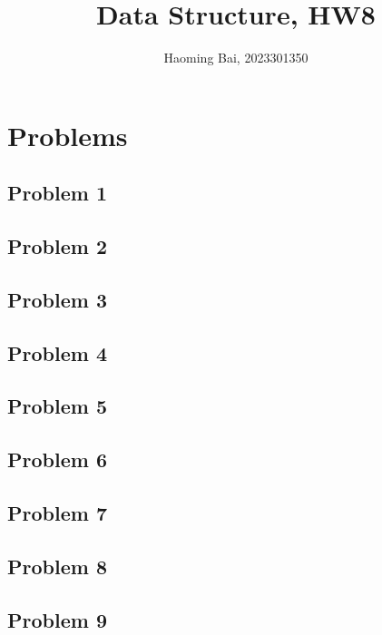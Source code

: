 \documentclass{ctexart}
\title{Data Structure, HW8}
\author{Haoming Bai, 2023301350}
\begin{document}
	\maketitle
  \tableofcontents
  \section{Problems}
  \subsection{Problem 1}
  
  \subsection{Problem 2}
  
  \subsection{Problem 3}
  
  \subsection{Problem 4}
  
  \subsection{Problem 5}
  
  \subsection{Problem 6}
  
  \subsection{Problem 7}
  
  \subsection{Problem 8}
  
  \subsection{Problem 9}
  
\end{document}
